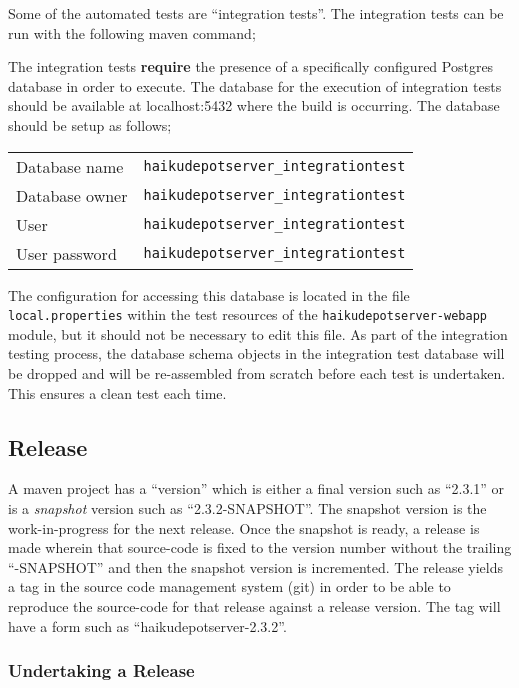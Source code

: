 Some of the automated tests are ``integration tests''.  The integration tests can be run with the following maven command;


The integration tests {\bf require} the presence of a specifically configured Postgres database in order to execute.  The database for the execution of integration tests should be available at localhost:5432 where the build is occurring.  The database should be setup as follows;

\begin{tabular}{ | l | l | }
  \hline
  Database name & {\tt haikudepotserver\_integrationtest} \\
  Database owner & {\tt haikudepotserver\_integrationtest} \\
  User & {\tt haikudepotserver\_integrationtest} \\
  User password & {\tt haikudepotserver\_integrationtest} \\
  \hline
\end{tabular}

The configuration for accessing this database is located in the file {\tt local.properties} within the test resources of the {\tt haikudepotserver-webapp} module, but it should not be necessary to edit this file.  As part of the integration testing process, the database schema objects in the integration test database will be dropped and will be re-assembled from scratch before each test is undertaken.  This ensures a clean test each time.

\subsection{Release}

A maven project has a ``version'' which is either a final version such as ``2.3.1'' or is a {\it snapshot} version such as ``2.3.2-SNAPSHOT''.  The snapshot version is the work-in-progress for the next release.  Once the snapshot is ready, a release is made wherein that source-code is fixed to the version number without the trailing ``-SNAPSHOT'' and then the snapshot version is incremented.  The release yields a tag in the source code management system (git) in order to be able to reproduce the source-code for that release against a release version.  The tag will have a form such as ``haikudepotserver-2.3.2''.

\subsubsection{Undertaking a Release}

